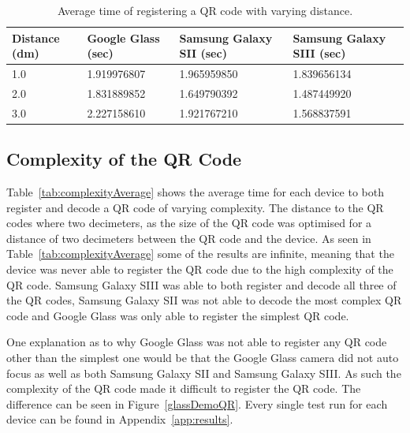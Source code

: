 	\begin{table}[H]%
    		\caption{Average time of registering a QR code with varying distance.} \label{tab:distanceAverage}
		\centering \begin{tabularx}{\textwidth}{l|X|X|X} \hline
		\textbf{Distance (dm)} & \textbf{Google Glass (sec)} & \textbf{Samsung Galaxy SII (sec)} & \textbf{Samsung Galaxy SIII (sec)} \\ \hline \hline
       
		1.0	&1.919976807	&1.965959850	&1.839656134	\\ \hline
		2.0	&1.831889852	&1.649790392	&1.487449920	\\ \hline
		3.0	&2.227158610	&1.921767210	&1.568837591	\\ \hline
		
		\end{tabularx}
	\end{table}

\subsection{Complexity of the QR Code}

Table~\ref{tab:complexityAverage} shows the average time for each device to both register and decode a QR code of varying complexity. The distance to the QR codes where two decimeters, as the size of the QR code was optimised for a distance of two decimeters between the QR code and the device. As seen in Table~\ref{tab:complexityAverage} some of the results are infinite, meaning that the device was never able to register the QR code due to the high complexity of the QR code. Samsung Galaxy SIII was able to both register and decode all three of the QR codes, Samsung Galaxy SII was not able to decode the most complex QR code and Google Glass was only able to register the simplest QR code.

One explanation as to why Google Glass was not able to register any QR code other than the simplest one would be that the Google Glass camera did not auto focus as well as both Samsung Galaxy SII and Samsung Galaxy SIII. As such the complexity of the QR code made it difficult to register the QR code. The difference can be seen in Figure~\ref{glassDemoQR}. Every single test run for each device can be found in Appendix~\ref{app:results}.

